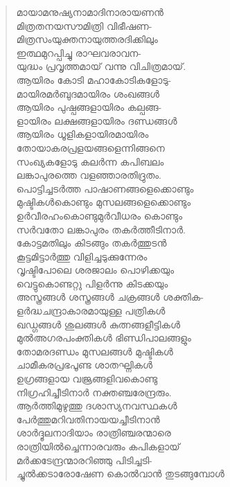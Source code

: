 \begin{verse}
മായാമനുഷ്യനാമാദിനാരായണന്‍\\
മിത്രതനയസൗമിത്രി വിഭീഷണ-\\
മിത്രസംയുക്തനായുത്തരദിക്കിലും\\
ഇത്ഥമുറപ്പിച്ചു രാഘവരാവന-\\
യുദ്ധം പ്രവൃത്തമായ് വന്നു വിചിത്രമായ്.\\
ആയിരം കോടി മഹാകോടികളോടു-\\
മായിരമര്‍ബുദമായിരം ശംഖങ്ങള്‍\\
ആയിരം പുഷ്പങ്ങളായിരം കല്പങ്ങ-\\
ളായിരം ലക്ഷങ്ങളായിരം ദണ്ഡങ്ങള്‍\\
ആയിരം ധൂളികളായിരമായിരം\\
തോയാകരപ്രളയങ്ങളെന്നിങ്ങനെ\\
സംഖ്യകളോടു കലര്‍ന്ന കപിബലം\\
ലങ്കാപുരത്തെ വളഞ്ഞാരതിദ്രുതം.\\
പൊട്ടിച്ചടര്‍ത്ത പാഷാണങ്ങളെക്കൊണ്ടും\\
മുഷ്ടികള്‍കൊണ്ടും മുസലങ്ങളെക്കൊണ്ടും\\
ഉര്‍വീരഹംകൊണ്ടുമുര്‍വീധരം കൊണ്ടും\\
സര്‍വതോ ലങ്കാപുരം തകര്‍ത്തീടിനാര്‍.\\
കോട്ടമതിലും കിടങ്ങും തകര്‍ത്തുടന്‍\\
കൂട്ടമിട്ടാര്‍ത്തു വിളിച്ചടുക്കുന്നേരം\\
വൃഷ്ടിപോലെ ശരജാലം പൊഴിക്കയും\\
വെട്ടുകൊണ്ടറ്റു പിളര്‍ന്നു കിടക്കയും\\
അസ്ത്രങ്ങള്‍ ശസ്ത്രങ്ങള്‍ ചക്രങ്ങള്‍ ശക്തിക-\\
ളര്‍ദ്ധചന്ദ്രാകാരമായുള്ള പത്രികള്‍\\
ഖഡ്ഗങ്ങള്‍ ശുലങ്ങള്‍ കുത്നങ്ങളീട്ടികള്‍\\
മുല്‍അഗരപംക്തികള്‍ ഭിണ്ഡിപാലങ്ങളും\\
തോമരദണ്ഡം മുസലങ്ങള്‍ മുഷ്ടികള്‍\\
ചാമീകരപ്രഭപൂണ്ട ശാതഘ്നികള്‍\\
ഉഗ്രങ്ങളായ വജ്രങ്ങളിവകൊണ്ടു\\
നിഗ്രഹിച്ചീടിനാര്‍ നക്തഞ്ചരേന്ദ്രരും.\\
ആര്‍ത്തിമുഴുത്തു ദശാസ്യനവസ്ഥകള്‍\\
പേര്‍ത്തുമറിവതിനായയച്ചീടിനാന്‍\\
ശാര്‍ദ്ദൂലനാദിയാം രാത്രിഞ്ചരന്മാരെ\\
രാത്രിയില്‍ച്ചെന്നാരവരും കപികളായ്\\
മര്‍ക്കടേന്ദ്രന്മാരറിഞ്ഞു പിടിച്ചടി-\\
ച്ചുല്‍ക്കടാരോഷേണ കൊല്‍വാന്‍ തുടങ്ങുമ്പോള്‍\\

\end{verse}

